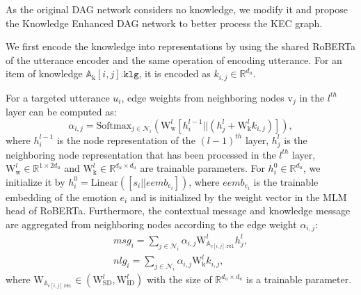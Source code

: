 \documentclass{article}
\begin{document}
As the original DAG network considers no knowledge, we modify it and propose the Knowledge Enhanced DAG network to better process the KEC graph. 

We first encode the knowledge into representations by using the shared RoBERTa of the utterance encoder and the same operation of encoding utterance. For an item of knowledge $\mathrm{\mathbb{A}_{k}}[i,j].\texttt{klg}$, it is encoded as $k_{i,j}\in \mathbb{R}^{d_u}$. 

For a targeted utterance $u_i$, edge weights from neighboring nodes $\mathrm{v}_j$ in the $l^{th}$ layer can be computed as:
\begin{equation}
    \alpha_{i,j}=\mathrm{Softmax}_{j\in\mathcal{N}_{i}}(\mathrm{W}_{\mathrm{w}}^{l}[h_{i}^{l-1}||(h_{j}^{l}+\mathrm{W}_{\mathrm{k}}^{l}k_{i,j})]),
\end{equation}
where $h_{i}^{l-1}$ is the node representation of the $(l-1)^{th}$ layer, $h_{j}^{l}$ is the neighboring node representation that has been processed in the $l^{th}$ layer, $\mathrm{W}_{\mathrm{w}}^{l}\in \mathbb{R}^{1\times2d_u}$ and $\mathrm{W}_{\mathrm{k}}^{l}\in \mathbb{R}^{d_u\times d_u}$ are trainable parameters. For $h_i^0\in\mathbb{R}^{d_u}$, we initialize it by $h_i^0=\mathrm{Linear}([s_{i}||eemb_{e_i}])$, where $eemb_{e_i}$ is the trainable embedding of the emotion $e_i$ and is initialized by the weight vector in the MLM head of RoBERTa. Furthermore, the contextual message and knowledge message are aggregated from neighboring nodes according to the edge weight $\alpha_{i,j}$:
\begin{eqnarray}
    msg_i= \sum_{j\in\mathcal{N}_{i}}{\alpha_{i,j}\mathrm{W}_{\mathbb{A}_{\mathrm{c}[i,j].\texttt{rel}}}^{l}h_{j}^{l}}, \\
    nlg_i = \sum_{j\in\mathcal{N}_{i}}{\alpha_{i,j}\mathrm{W}_{\mathrm{k}}^{l}k_{i,j}},
\end{eqnarray}
where $\mathrm{W}_{\mathbb{A}_{\mathrm{c}[i,j].\texttt{rel}}}\in(\mathrm{W}_{\mathrm{SD}}^{l},\mathrm{W}_{\mathrm{ID}}^{l})$ with the size of $\mathbb{R}^{d_u\times d_u}$ is a trainable parameter. 
\end{document}
